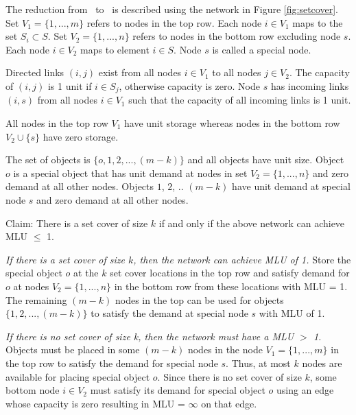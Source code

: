 

The reduction from \setcover\ to \optloc\ is described using the network in Figure \ref{fig:setcover}. Set $V_1 = \{1, ..., m\}$  refers to nodes in the top row. Each node $i \in V_1$ maps to the set $S_i \subset S$. Set $V_2 = \{1, ..., n\}$ refers to nodes in the bottom row excluding node $s$. Each node $i \in V_2$ maps to  element $i \in S$. Node $s$ is called a special node. 


Directed links $(i, j)$ exist from all nodes $i \in V_1$ to all nodes $j \in V_2$. The capacity of $(i,j)$ is 1 unit if $i \in S_j$, otherwise capacity is zero. Node $s$ has incoming links $(i, s)$ from all nodes  $i \in V_1$ such that  the capacity of all incoming links is 1 unit.

All nodes in the top row $V_1$ have unit storage whereas nodes in the bottom row $V_2\cup \{s\}$ have zero storage.

The set of objects is $\{o, 1, 2, ..., (m-k)\}$ and all objects have unit size. Object $o$ is a special object that has unit demand at nodes in set $V_2 = \{1, ..., n\}$ and zero demand at all other nodes. Objects $1$, $2$, .. $(m-k)$ have unit demand at special node $s$ and zero demand at all other nodes.


{\sc Claim:} There is a set cover of size $k$ if and only if the above network can achieve MLU $\leq$ 1.

\emph{If there is a set cover of size $k$, then the network can achieve MLU of 1.} Store the special object $o$ at the $k$ set cover locations in the top row and satisfy demand for $o$ at nodes  $V_2 = \{1, ..., n\}$ in the bottom row from these locations with MLU = 1. The remaining $(m-k)$ nodes in the top can be used for objects $\{1, 2, ..., (m-k)\}$ to satisfy the demand at special node $s$ with MLU of 1.

\emph{If there is no set cover of size k, then the network must have a MLU $>$ 1.} Objects must be placed in some $(m-k)$ nodes in the node $V_1 = \{1, ..., m\}$ in the top row to satisfy the demand for special node $s$. Thus, at most $k$ nodes are available for placing special object $o$. Since there is no set cover of size $k$,  some bottom node $i \in V_2$  must satisfy its demand for special object $o$ using an edge whose capacity is zero  resulting in MLU = $\infty$ on that edge.

